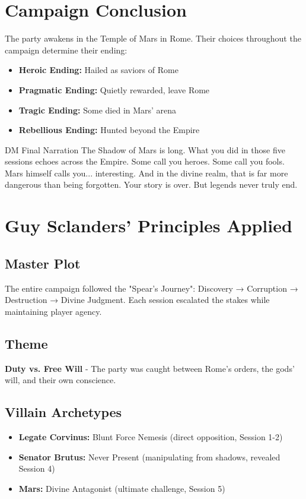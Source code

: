 \documentclass[letterpaper,oneside,twocolumn,openany]{dndbook}
\begin{document}
\section{Campaign Conclusion}

The party awakens in the Temple of Mars in Rome. Their choices throughout the campaign determine their ending:

\begin{itemize}
\item \textbf{Heroic Ending:} Hailed as saviors of Rome
\item \textbf{Pragmatic Ending:} Quietly rewarded, leave Rome
\item \textbf{Tragic Ending:} Some died in Mars' arena
\item \textbf{Rebellious Ending:} Hunted beyond the Empire
\end{itemize}

\begin{paperbox}{DM Final Narration}
The Shadow of Mars is long. What you did in those five sessions echoes across the Empire. Some call you heroes. Some call you fools. Mars himself calls you... interesting. And in the divine realm, that is far more dangerous than being forgotten. Your story is over. But legends never truly end.
\end{paperbox}

\section{Guy Sclanders' Principles Applied}

\subsection{Master Plot}
The entire campaign followed the "Spear's Journey": Discovery → Corruption → Destruction → Divine Judgment. Each session escalated the stakes while maintaining player agency.

\subsection{Theme}
\textbf{Duty vs. Free Will} - The party was caught between Rome's orders, the gods' will, and their own conscience.

\subsection{Villain Archetypes}
\begin{itemize}
\item \textbf{Legate Corvinus:} Blunt Force Nemesis (direct opposition, Session 1-2)
\item \textbf{Senator Brutus:} Never Present (manipulating from shadows, revealed Session 4)
\item \textbf{Mars:} Divine Antagonist (ultimate challenge, Session 5)
\end{itemize}
\end{document}
